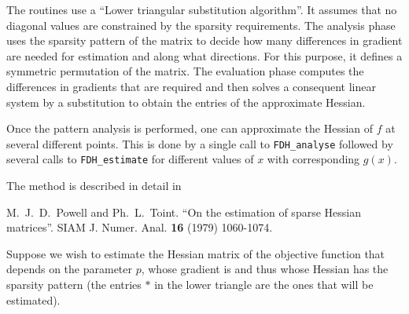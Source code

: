 \documentclass{galahad}
\newcommand{\packagename}{FDH}
\begin{document}

\galmethod
The routines  use a ``Lower triangular  substitution
algorithm''. It assumes  that no  diagonal
values  are constrained  by the sparsity  requirements.
The analysis phase uses the  sparsity pattern  of
the matrix  to decide  how many differences  in
gradient are needed  for estimation  and along what directions.
For this purpose,  it defines  a symmetric permutation  of the
matrix. The evaluation phase  computes  the differences  in
gradients  that are required  and then  solves  a consequent
linear  system by a  substitution to obtain  the entries of  the
approximate  Hessian. 

Once the  pattern analysis  is performed,  one can
approximate  the Hessian  of $f$ at several different points.
This is done  by a single call  to {\tt \packagename\_analyse}
followed  by several calls to {\tt \packagename\_estimate}
for different values of $x$ with corresponding $g(x)$.

\vspace*{1mm}

\galreference
\vspace*{1mm}

\noindent
The method is described in detail in
\vspace*{1mm}

\noindent
M.\ J.\ D.\ Powell and  Ph.\ L.\ Toint. ``On the estimation  of
sparse Hessian matrices''. SIAM J. Numer. Anal. {\bf 16} (1979) 1060-1074.


\galexamples
Suppose we wish to estimate the Hessian matrix of the objective function 
that depends on the parameter $p$, whose gradient is
and thus whose Hessian has the sparsity pattern
(the entries $\ast$ in the lower triangle are the ones that will be estimated).
\end{document}
